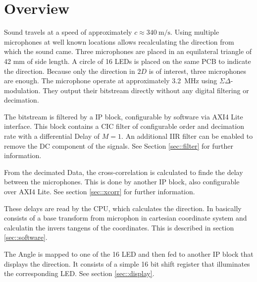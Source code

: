 \section{Overview}
Sound travels at a speed of approximately $c\approx \SI{340}{\meter\per\s}$.
Using multiple microphones at well known locations allows recalculating the direction from which the sound came.
Three microphones are placed in an equilateral triangle of 42 mm of side length.
A circle of 16 LEDs is placed on the same PCB to indicate the direction.
Because only the direction in $2D$ is of interest, three microphones are enough.
The microphone operate at approximately \SI{3.2}{\mega\hertz} using $\Sigma\Delta$-modulation.
They output their bitstream directly without any digital filtering or decimation.

The bitstream is filtered by a IP block, configurable by software via AXI4 Lite interface.
This block contains a CIC filter of configurable order and decimation rate with a differential Delay of $M=1$.
An additional IIR filter can be enabled to remove the DC component of the signals.
See Section \ref{sec::filter} for further information.

From the decimated Data, the cross-correlation is calculated to finde the delay between the microphones.
This is done by another IP block, also configurable over AXI4 Lite.
See section \ref{sec::xcorr} for further information.

These delays are read by the CPU, which calculates the direction. 
In basically consists of a base transform from microphon in cartesian coordinate system and calculatin the invers tangens of the coordinates.
This is described in section \ref{sec::software}.

The Angle is mapped to one of the 16 LED and then fed to another IP block that displays the direction.
It consists of a simple 16 bit shift register that illuminates the corresponding LED.
See section \ref{sec::display}.

